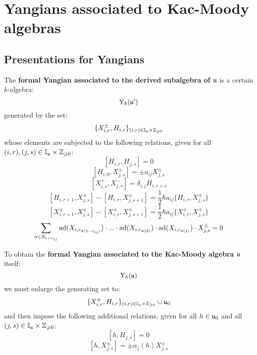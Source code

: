 \section{Yangians associated to Kac-Moody algebras}
    \subsection{Presentations for Yangians}
        \begin{definition} \label{def: formal_yangians_associated_to_symmetrisable_kac_moody_algebras}
            The \textbf{formal Yangian associated to the derived subalgebra of $\mathfrak{u}$} is a certain $k$-algebra:
                $$\mathrm{Y}_{\hbar}(\mathfrak{u}')$$
            generated by the set:
                $$\{X_{i, r}^{\pm}, H_{i, r}\}_{(i, r) \in \simpleroots_{\fraku} \x \Z_{\geq 0}}$$
            whose elements are subjected to the following relations, given for all $(i, r), (j, s) \in \simpleroots_{\fraku} \x \Z_{\geq 0}$:
                $$[H_{i, r}, H_{j, s}] = 0$$
                $$[H_{i, 0}, X_{j, s}^{\pm}] = \pm a_{ij} X_{j, s}^{\pm}$$
                $$[X_{i, r}^+, X_{j, s}^-] = \delta_{i, j} H_{i, r + s}$$
                $$[H_{i, r + 1}, X^{\pm}_{j, s}] - [H_{i, r}, X^{\pm}_{j, s + 1}] = \frac12 \hbar a_{ij} \{H_{i, r}, X^{\pm}_{j, s}\}$$
                $$[X^{\pm}_{i, r + 1}, X^{\pm}_{j, s}] - [X^{\pm}_{i, r}, X^{\pm}_{j, s + 1}] = \frac12 \hbar a_{ij} \{X^{\pm}_{i, r}, X^{\pm}_{j, s}\}$$
                $$\sum_{ \sigma \in S_{1 - c_{ij}} } \mathrm{ad}(X_{ i, r_{\sigma(1 - c_{ij})} }) \cdot ... \cdot \mathrm{ad}(X_{ i, r_{\sigma(2)} }) \cdot \mathrm{ad}(X_{ i, r_{\sigma(1)} }) \cdot X_{j, s}^{\pm} = 0$$
                
            To obtain the \textbf{formal Yangian associated to the Kac-Moody algebra $\mathfrak{u}$} itself:
                $$\mathrm{Y}_{\hbar}(\mathfrak{u})$$
            we must enlarge the generating set to:
                $$\{X_{i, r}^{\pm}, H_{i, r}\}_{(i, r) \in \simpleroots_{\fraku} \x \Z_{\geq 0}} \cup \fraku_0$$
            and then impose the following additional relations, given for all $h \in \mathfrak{u}_0$ and all $(j, s) \in \simpleroots_{\fraku} \x \Z_{\geq 0}$:
                $$[h, H_{j, s}] = 0$$
                $$[h, X_{j, s}^{\pm}] = \pm \alpha_j(h) X_{j, s}^{\pm}$$
        \end{definition}
